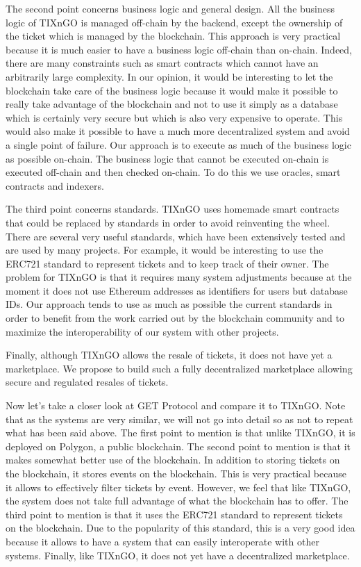 \documentclass[a4paper,11pt,oneside]{report}
\begin{document}
The second point concerns business logic and general design. All the business logic of TIXnGO is managed off-chain by the backend, except the ownership of the ticket which is managed by the blockchain. This approach is very practical because it is much easier to have a business logic off-chain than on-chain. Indeed, there are many constraints such as smart contracts which cannot have an arbitrarily large complexity. In our opinion, it would be interesting to let the blockchain take care of the business logic because it would make it possible to really take advantage of the blockchain and not to use it simply as a database which is certainly very secure but which is also very expensive to operate. This would also make it possible to have a much more decentralized system and avoid a single point of failure. Our approach is to execute as much of the business logic as possible on-chain. The business logic that cannot be executed on-chain is executed off-chain and then checked on-chain. To do this we use oracles, smart contracts and indexers.

The third point concerns standards. TIXnGO uses homemade smart contracts that could be replaced by standards in order to avoid reinventing the wheel. There are several very useful standards, which have been extensively tested and are used by many projects. For example, it would be interesting to use the ERC721 standard to represent tickets and to keep track of their owner. The problem for TIXnGO is that it requires many system adjustments because at the moment it does not use Ethereum addresses as identifiers for users but database IDs. Our approach tends to use as much as possible the current standards in order to benefit from the work carried out by the blockchain community and to maximize the interoperability of our system with other projects.

Finally, although TIXnGO allows the resale of tickets, it does not have yet a marketplace. We propose to build such a fully decentralized marketplace allowing secure and regulated resales of tickets.

Now let's take a closer look at GET Protocol and compare it to TIXnGO. Note that as the systems are very similar, we will not go into detail so as not to repeat what has been said above. The first point to mention is that unlike TIXnGO, it is deployed on Polygon, a public blockchain. The second point to mention is that it makes somewhat better use of the blockchain. In addition to storing tickets on the blockchain, it stores events on the blockchain. This is very practical because it allows to effectively filter tickets by event. However, we feel that like TIXnGO, the system does not take full advantage of what the blockchain has to offer. The third point to mention is that it uses the ERC721 standard to represent tickets on the blockchain. Due to the popularity of this standard, this is a very good idea because it allows to have a system that can easily interoperate with other systems. Finally, like TIXnGO, it does not yet have a decentralized marketplace.
\end{document}
